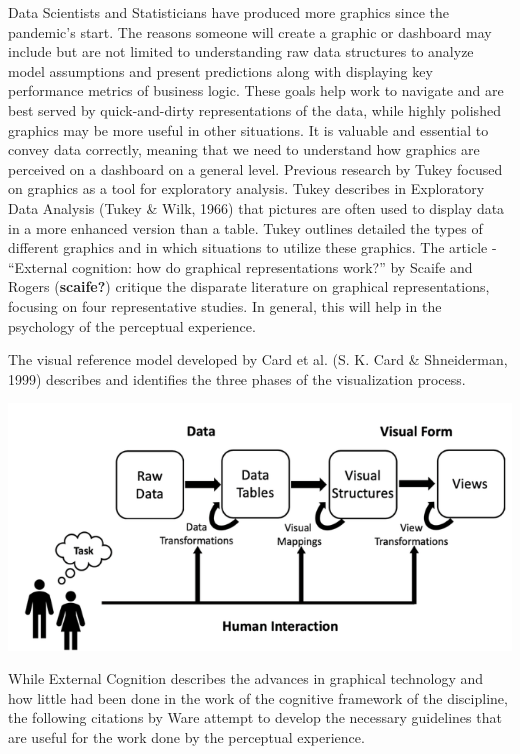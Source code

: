 \documentclass[print]{nuthesis}
\begin{document}
Data Scientists and Statisticians have produced more graphics since the pandemic's start. The reasons someone will create a graphic or dashboard may include but are not limited to understanding raw data structures to analyze model assumptions and present predictions along with displaying key performance metrics of business logic. These goals help work to navigate and are best served by quick-and-dirty representations of the data, while highly polished graphics may be more useful in other situations. It is valuable and essential to convey data correctly, meaning that we need to understand how graphics are perceived on a dashboard on a general level. Previous research by Tukey focused on graphics as a tool for exploratory analysis. Tukey describes in Exploratory Data Analysis (Tukey \& Wilk, 1966) that pictures are often used to display data in a more enhanced version than a table. Tukey outlines detailed the types of different graphics and in which situations to utilize these graphics. The article - ``External cognition: how do graphical representations work?'' by Scaife and Rogers (\textbf{scaife?}) critique the disparate literature on graphical representations, focusing on four representative studies. In general, this will help in the psychology of the perceptual experience.

The visual reference model developed by Card et al. (S. K. Card \& Shneiderman, 1999) describes and identifies the three phases of the visualization process.

\begin{center}
\includegraphics[width=\textwidth]{figure/VizModelDiagram}
\end{center}

While External Cognition describes the advances in graphical technology and how little had been done in the work of the cognitive framework of the discipline, the following citations by Ware attempt to develop the necessary guidelines that are useful for the work done by the perceptual experience.
\end{document}
